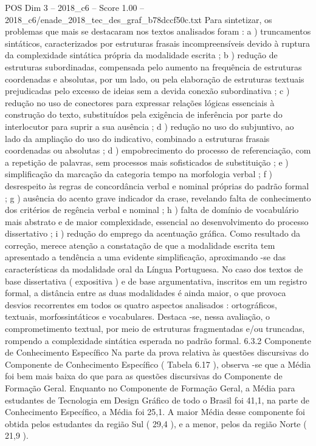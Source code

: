 \begin{textsample}{POS Dim 3 – 2018\_c6 – Score 1.00 – 2018\_c6/enade\_2018\_tec\_des\_graf\_b78dccf50c.txt}
Para sintetizar, os problemas que mais se destacaram nos textos analisados foram : a ) truncamentos sintáticos, caracterizados por estruturas frasais incompreensíveis devido à ruptura da complexidade sintática própria da modalidade escrita ; b ) redução de estruturas subordinadas, compensada pelo aumento na frequência de estruturas coordenadas e absolutas, por um lado, ou pela elaboração de estruturas textuais prejudicadas pelo excesso de ideias sem a devida conexão subordinativa ; c ) redução no uso de conectores para expressar relações lógicas essenciais à construção do texto, substituídos pela exigência de inferência por parte do interlocutor para suprir a sua ausência ; d ) redução no uso do subjuntivo, ao lado da ampliação do uso do indicativo, combinado a estruturas frasais coordenadas ou absolutas ; d ) empobrecimento do processo de referenciação, com a repetição de palavras, sem processos mais sofisticados de substituição ; e ) simplificação da marcação da categoria tempo na morfologia verbal ; f ) desrespeito às regras de concordância verbal e nominal próprias do padrão formal ; g ) ausência do acento grave indicador da crase, revelando falta de conhecimento dos critérios de regência verbal e nominal ; h ) falta de domínio de vocabulário mais abstrato e de maior complexidade, essencial ao desenvolvimento do processo dissertativo ; i ) redução do emprego da acentuação gráfica.
Como resultado da correção, merece atenção a constatação de que a modalidade escrita tem apresentado a tendência a uma evidente simplificação, aproximando -se das características da modalidade oral da Língua Portuguesa.
No caso dos textos de base dissertativa ( expositiva ) e de base argumentativa, inscritos em um registro formal, a distância entre as duas modalidades é ainda maior, o que provoca desvios recorrentes em todos os quatro aspectos analisados : ortográficos, textuais, morfossintáticos e vocabulares.
Destaca -se, nessa avaliação, o comprometimento textual, por meio de estruturas fragmentadas e/ou truncadas, rompendo a complexidade sintática esperada no padrão formal. 6.3.2 Componente de Conhecimento Específico Na parte da prova relativa às questões discursivas do Componente de Conhecimento Específico ( Tabela 6.17 ), observa -se que a Média foi bem mais baixa do que para as questões discursivas do Componente de Formação Geral.
Enquanto no Componente de Formação Geral, a Média para estudantes de Tecnologia em Design Gráfico de todo o Brasil foi 41,1, na parte de Conhecimento Específico, a Média foi 25,1.
A maior Média desse componente foi obtida pelos estudantes da região Sul ( 29,4 ), e a menor, pelos da região Norte ( 21,9 ).

\end{textsample}
